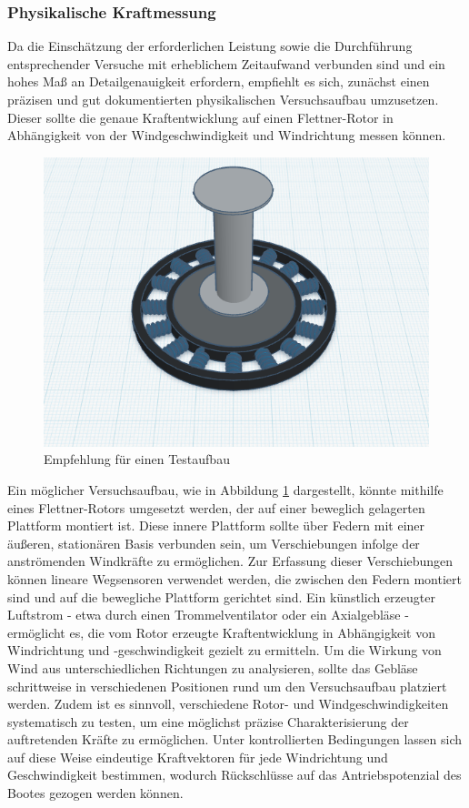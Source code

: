 \documentclass[a4paper,12pt]{article}
\begin{document}
\subsubsection{Physikalische Kraftmessung}
\label{sec:Empfehlungsaufbau}
Da die Einschätzung der erforderlichen Leistung sowie die Durchführung entsprechender Versuche mit erheblichem Zeitaufwand verbunden sind und ein hohes Maß an Detailgenauigkeit erfordern, empfiehlt es sich, zunächst einen präzisen und gut dokumentierten physikalischen Versuchsaufbau umzusetzen. Dieser sollte die genaue Kraftentwicklung auf einen Flettner-Rotor in Abhängigkeit von der Windgeschwindigkeit und Windrichtung messen können. 
\begin{figure}[H]
    \centering
    \includegraphics[width=0.7\linewidth]{images/Empfehlungsaufbau.png}
    \caption{Empfehlung für einen Testaufbau}
    \label{fig:Empfehlungsaufbau}
\end{figure}
Ein möglicher Versuchsaufbau, wie in Abbildung \ref{fig:Empfehlungsaufbau} dargestellt, könnte mithilfe eines Flettner-Rotors umgesetzt werden, der auf einer beweglich gelagerten Plattform montiert ist. Diese innere Plattform sollte über Federn mit einer äußeren, stationären Basis verbunden sein, um Verschiebungen infolge der anströmenden Windkräfte zu ermöglichen. \newline
Zur Erfassung dieser Verschiebungen können lineare Wegsensoren verwendet werden, die zwischen den Federn montiert sind und auf die bewegliche Plattform gerichtet sind. Ein künstlich erzeugter Luftstrom - etwa durch einen Trommelventilator oder ein Axialgebläse - ermöglicht es, die vom Rotor erzeugte Kraftentwicklung in Abhängigkeit von Windrichtung und -geschwindigkeit gezielt zu ermitteln.
Um die Wirkung von Wind aus unterschiedlichen Richtungen zu analysieren, sollte das Gebläse schrittweise in verschiedenen Positionen rund um den Versuchsaufbau platziert werden. Zudem ist es sinnvoll, verschiedene Rotor- und Windgeschwindigkeiten systematisch zu testen, um eine möglichst präzise Charakterisierung der auftretenden Kräfte zu ermöglichen.
Unter kontrollierten Bedingungen lassen sich auf diese Weise eindeutige Kraftvektoren für jede Windrichtung und Geschwindigkeit bestimmen, wodurch Rückschlüsse auf das Antriebspotenzial des Bootes gezogen werden können.
\end{document}
